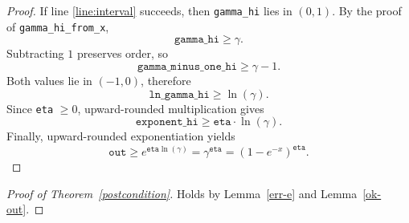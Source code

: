 \documentclass{article}
\begin{document}
\begin{proof}
If line \ref{line:interval} succeeds, then \texttt{gamma\_hi} lies in $(0,1)$.
By the proof of \texttt{gamma\_hi\_from\_x},
\[
\texttt{gamma\_hi} \ge \gamma.
\]
Subtracting $1$ preserves order, so
\[
\texttt{gamma\_minus\_one\_hi} \ge \gamma - 1.
\]
Both values lie in $(-1,0)$, therefore
\[
\texttt{ln\_gamma\_hi} \ge \ln(\gamma).
\]
Since \texttt{eta} $\ge 0$, upward-rounded multiplication gives
\[
\texttt{exponent\_hi} \ge \texttt{eta} \cdot \ln(\gamma).
\]
Finally, upward-rounded exponentiation yields
\[
\texttt{out} \ge e^{\texttt{eta} \ln(\gamma)} = \gamma^{\texttt{eta}}
= (1 - e^{-x})^{\texttt{eta}}.
\]
\end{proof}

\begin{proof}[Proof of Theorem~\ref{postcondition}]
Holds by Lemma~\ref{err-e} and Lemma~\ref{ok-out}.
\end{proof}
\end{document}
